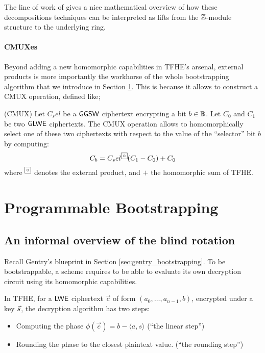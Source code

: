The line of work of \cite{chimera, AC:BCGGJ24} gives a nice mathematical overview of how these decompositions techniques can be interpreted as lifts from the $\mathbb{Z}$-module structure to the underlying ring. 



\paragraph{CMUXes}

Beyond adding a new homomorphic capabilities in TFHE's arsenal, external products is more importantly the workhorse of the whole bootstrapping algorithm that we introduce in Section \ref{sec:pbs}. This is because it allows to construct a CMUX operation, defined like;

\begin{definition}(CMUX)
	Let $C_sel$ be a $\textsf{GGSW}$ ciphertext encrypting a bit $b \in \mathbb{B}$. Let $C_0$ and $C_1$ be two $\textsf{GLWE}$ ciphertexts. The CMUX operation allows to homomorphically select one of these two ciphertexts with respect to the value of the ``selector'' bit $b$ by computing:
	\begin{equation*}
		C_b = C_sel \squarewithdot (C_1 - C_0) + C_0
	\end{equation*}
	where $\squarewithdot$ denotes the external product, and $+$ the homomorphic sum of TFHE.
\end{definition}






\section{Programmable Bootstrapping}
\label{sec:pbs}

\subsection{An informal overview of the blind rotation}

Recall Gentry's blueprint in Section \ref{sec:gentry_bootstrapping}. To be bootstrappable, a scheme requires to be able to evaluate its own decryption circuit using its homomorphic capabilities.

In TFHE, for a $\textsf{LWE}$ ciphertext $\vec c$ of form $(a_0, \dots, a_{n-1}, b)$, encrypted under a key $\vec s$, the decryption algorithm has two steps:
\begin{itemize}
	\item Computing the phase $\phi(\vec c) = b - \langle a, s \rangle$ (``the linear step'')
	\item Rounding the phase to the closest plaintext value. (``the rounding step'')
\end{itemize}

